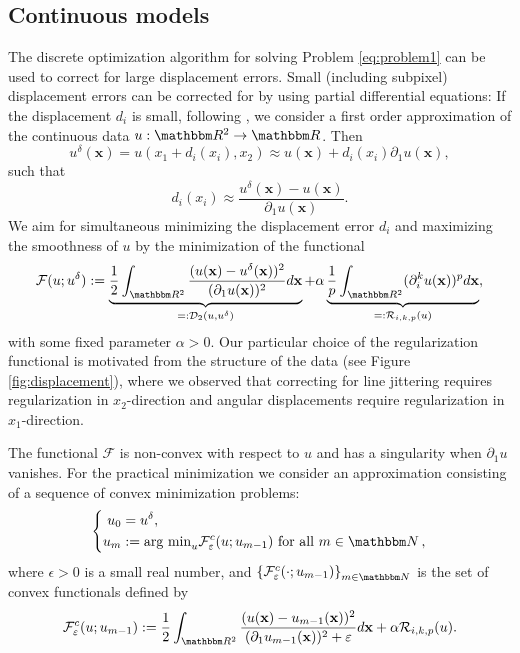 \documentclass[runningheads,a4paper]{llncs}\usepackage{latexsym}
\newcommand{\R}{\mathbbm R}
\newcommand{\N}{\mathbbm N}
\newcommand{\ve}{\varepsilon}
\newcommand{\argmin}{\text{arg min}}
\newcommand{\ud}{u^\delta}
\newcommand{\set}[1]{\left\{ #1 \right\}}
\begin{document}
\subsection{Continuous models}
The discrete optimization algorithm for solving Problem \eqref{eq:problem1} can be used to correct for large displacement errors.
Small (including subpixel) displacement errors can be corrected for by using partial differential equations: If the displacement $d_i$ 
is small, following \cite{LenSch11,DonPatSchOek15}, we consider a first order approximation of the continuous data 
$u: \R^2 \to \R$. Then
\begin{equation}
\label{eq:taylor}
   \ud(\mathbf{x}) = u(x_1+d_i(x_i),x_2)\approx u(\mathbf{x}) + d_i(x_i)\partial_1 u(\mathbf{x}) ,
\end{equation}
such that
\begin{equation}
\label{eq:disp}
   d_i(x_i) \approx \frac{\ud(\mathbf{x})-u(\mathbf{x})}{\partial_1 u(\mathbf{x})}.
\end{equation}
We aim for simultaneous minimizing the displacement error $d_i$ and maximizing the smoothness of 
$u$ by the minimization of the functional
\begin{equation}
\label{eq:non_convex}
\mathcal{F}(u;\ud) :=  \underbrace{\frac{1}{2}\int_{\R^2}
                           \frac{(u(\mathbf{x})-\ud(\mathbf{x}))^2}{(\partial_1 u(\mathbf{x}))^2}d\mathbf{x}}_{=:\mathcal{D}_2(u,\ud)}
                           +\alpha  
                           \underbrace{\frac{1}{p} \int_{\R^2}(\partial_i^k u(\mathbf{x}))^p d\mathbf{x}}_{=:\mathcal{R}_{i,k,p}(u)},
\end{equation}
with some fixed parameter $\alpha >0$. Our particular choice of the regularization functional is motivated from the 
structure of the data (see Figure \ref{fig:displacement}), where we observed that correcting for line jittering requires 
regularization in $x_2$-direction 
and angular displacements require regularization in $x_1$-direction. 


The functional $\mathcal{F}$ is non-convex with respect to $u$ and has a singularity when $\partial_1 u$ vanishes. 
For the practical minimization we consider an approximation consisting of a sequence of convex minimization problems:
\begin{equation}
\left\{
\begin{aligned}
\label{eq:lagged_ite}
u_0 & =  \ud,\\
u_m &:=  \argmin_{u} \mathcal{F}_\ve^c(u;u_{m-1}) \text{ for all } m \in \N\,,
\end{aligned}
\right.
\end{equation}
where $\epsilon>0$ is a small real number, and $\set{\mathcal{F}_\ve^c(\cdot;u_{m-1})}_{m \in \N}$ is the set of convex functionals defined by 
\begin{equation}
\label{eq:convex_eps}
\mathcal{F}^c_\ve(u;u_{m-1}) := 
\frac{1}{2} \int_{\R^2}\frac{(u(\mathbf{x})-u_{m-1}(\mathbf{x}))^2}
                            {(\partial_1 u_{m-1}(\mathbf{x}))^2+\ve}d\mathbf{x} + \alpha \mathcal{R}_{i,k,p}(u).
\end{equation}
\end{document}
